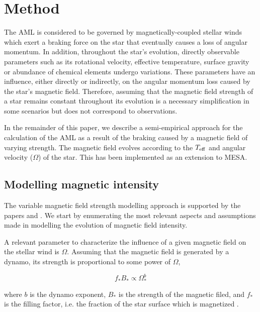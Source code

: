 \documentclass[fleqn,usenatbib]{mnras}
\begin{document}
\section{Method} \label{sec_method}
The AML is considered to be governed by magnetically-coupled stellar winds which exert a braking force on the star that eventually causes a loss of angular momentum. In addition, throughout the star's evolution, directly observable parameters such as its rotational velocity, effective temperature, surface gravity or abundance of chemical elements undergo variations. These parameters have an influence, either directly or indirectly, on the angular momentum loss caused by the star's magnetic field. Therefore, assuming that the magnetic field strength of a star remains constant throughout its evolution is a necessary simplification in some scenarios but does not correspond to observations.\par

In the remainder of this paper, we describe a semi-empirical approach for the calculation of the AML as a result of the braking caused by a magnetic field of varying strength. The magnetic field evolves according to the $T_{\mathrm{eff}}$ and angular velocity ($\Omega$) of the star. This has been implemented as an extension to MESA.

\subsection{Modelling magnetic intensity} \label{mod_mbi}
The variable magnetic field strength modelling approach is supported by the papers \cite{Cranmer2011} and \cite{Gallet2013}. We start by enumerating the most relevant aspects and assumptions made in modelling the evolution of magnetic field intensity.\par 

A relevant parameter to characterize the influence of a given magnetic field on the stellar wind is $\Omega$. Assuming that the magnetic field is generated by a dynamo, its strength is proportional to some power of $\Omega$,
\begin{ceqn}
\begin{equation}
    f_*B_* \propto \Omega_*^b \label{eq:mf_strenght}
\end{equation}
\end{ceqn}
where $b$ is the dynamo exponent, $B_*$ is the strength of the magnetic filed, and $f_*$ is the filling factor, i.e. the fraction of the star surface which is magnetized \citep{Gallet2013}.
\end{document}
